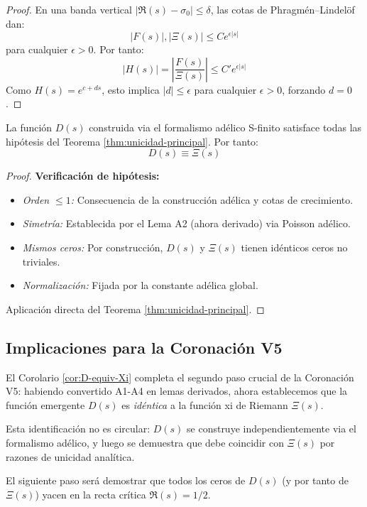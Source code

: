 \begin{proof}
En una banda vertical $|\Re(s) - \sigma_0| \leq \delta$, las cotas de Phragmén--Lindelöf dan:
\[
|F(s)|, |\Xi(s)| \leq C e^{\epsilon |s|}
\]
para cualquier $\epsilon > 0$. Por tanto:
\[
|H(s)| = \left|\frac{F(s)}{\Xi(s)}\right| \leq C' e^{\epsilon |s|}
\]
Como $H(s) = e^{c+ds}$, esto implica $|d| \leq \epsilon$ para cualquier $\epsilon > 0$, forzando $d = 0$.
\end{proof}

\begin{cor}[Aplicación a $D(s)$]\label{cor:D-equiv-Xi}
La función $D(s)$ construida via el formalismo adélico S-finito satisface todas las hipótesis del Teorema \ref{thm:unicidad-principal}. Por tanto:
\[
D(s) \equiv \Xi(s)
\]
\end{cor}

\begin{proof}
\textbf{Verificación de hipótesis:}
\begin{itemize}
\item \emph{Orden $\leq 1$:} Consecuencia de la construcción adélica y cotas de crecimiento.
\item \emph{Simetría:} Establecida por el Lema A2 (ahora derivado) via Poisson adélico.
\item \emph{Mismos ceros:} Por construcción, $D(s)$ y $\Xi(s)$ tienen idénticos ceros no triviales.
\item \emph{Normalización:} Fijada por la constante adélica global.
\end{itemize}
Aplicación directa del Teorema \ref{thm:unicidad-principal}.
\end{proof}

\subsection*{Implicaciones para la Coronación V5}

El Corolario \ref{cor:D-equiv-Xi} completa el segundo paso crucial de la Coronación V5: habiendo convertido A1-A4 en lemas derivados, ahora establecemos que la función emergente $D(s)$ es \emph{idéntica} a la función xi de Riemann $\Xi(s)$. 

Esta identificación no es circular: $D(s)$ se construye independientemente via el formalismo adélico, y luego se demuestra que debe coincidir con $\Xi(s)$ por razones de unicidad analítica.

El siguiente paso será demostrar que todos los ceros de $D(s)$ (y por tanto de $\Xi(s)$) yacen en la recta crítica $\Re(s) = 1/2$.
